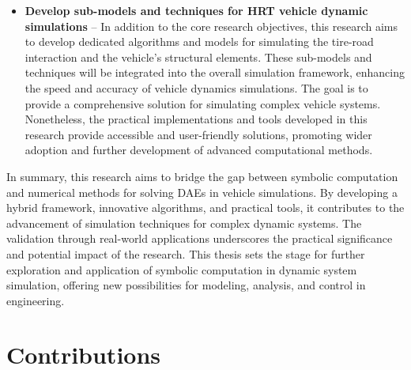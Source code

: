 \begin{itemize}
  \item \textbf{Develop sub-models and techniques for \ac{HRT} vehicle dynamic simulations} -- In addition to the core research objectives, this research aims to develop dedicated algorithms and models for simulating the tire-road interaction and the vehicle's structural elements. These sub-models and techniques will be integrated into the overall simulation framework, enhancing the speed and accuracy of vehicle dynamics simulations. The goal is to provide a comprehensive solution for simulating complex vehicle systems. Nonetheless, the practical implementations and tools developed in this research provide accessible and user-friendly solutions, promoting wider adoption and further development of advanced computational methods.
\end{itemize}

In summary, this research aims to bridge the gap between symbolic computation and numerical methods for solving \acp{DAE} in vehicle simulations. By developing a hybrid framework, innovative algorithms, and practical tools, it contributes to the advancement of simulation techniques for complex dynamic systems. The validation through real-world applications underscores the practical significance and potential impact of the research. This thesis sets the stage for further exploration and application of symbolic computation in dynamic system simulation, offering new possibilities for modeling, analysis, and control in engineering.


\section{Contributions}

